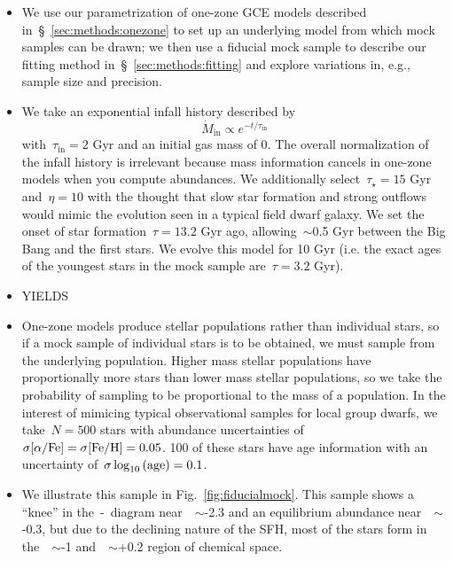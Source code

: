 \documentclass[ms.tex]{subfiles}
\begin{document}
\begin{itemize}

	\item We use our parametrization of one-zone GCE models described
	in~\S~\ref{sec:methods:onezone} to set up an underlying model from which
	mock samples can be drawn; we then use a fiducial mock sample to describe
	our fitting method in~\S~\ref{sec:methods:fitting} and explore variations
	in, e.g., sample size and precision.

	\item We take an exponential infall history described by
	\begin{equation}
	\dot{M}_\text{in} \propto e^{-t/\tau_\text{in}}
	\end{equation}
	with~$\tau_\text{in} = 2$ Gyr and an initial gas mass of 0.
	The overall normalization of the infall history is irrelevant because
	mass information cancels in one-zone models when you compute abundances.
	We additionally select~$\tau_\star = 15$ Gyr and~$\eta = 10$ with the
	thought that slow star formation and strong outflows would mimic the
	evolution seen in a typical field dwarf galaxy.
	We set the onset of star formation~$\tau = 13.2$ Gyr ago, allowing~$\sim$0.5
	Gyr between the Big Bang and the first stars.
	We evolve this model for 10 Gyr (i.e. the exact ages of the youngest stars
	in the mock sample are~$\tau = 3.2$ Gyr).

	\item {\color{red} YIELDS}

	\item One-zone models produce stellar populations rather than individual
	stars, so if a mock sample of individual stars is to be obtained, we must
	sample from the underlying population.
	Higher mass stellar populations have proportionally more stars than lower
	mass stellar populations, so we take the probability of sampling to be
	proportional to the mass of a population.
	In the interest of mimicing typical observational samples for local group
	dwarfs, we take~$N = 500$ stars with abundance uncertainties of
	$\sigma\text{[$\alpha$/Fe]} = \sigma\text{[Fe/H]} = 0.05$.
	100 of these stars have age information with an uncertainty
	of~$\sigma\log_{10}\text{(age)} = 0.1$.

	\item We illustrate this sample in Fig.~\ref{fig:fiducialmock}.
	This sample shows a ``knee'' in the~\afe-\feh~diagram near~\feh~$\sim$-2.3
	and an equilibrium abundance near~\feh~$\sim$-0.3, but due to the
	declining nature of the SFH, most of the stars form in
	the~\feh~$\sim$-1 and~\afe~$\sim$+0.2 region of chemical space.

\end{itemize}
\end{document}
